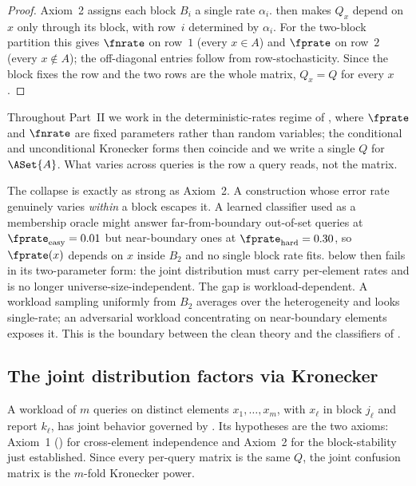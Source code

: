\begin{proof}
Axiom~2 assigns each block $B_i$ a single rate $\alpha_i$.
 then makes $Q_x$ depend on $x$ only through its
block, with row~$i$ determined by $\alpha_i$. For the two-block partition
this gives $\fnrate$ on row~$1$ (every $x \in A$) and $\fprate$ on row~$2$
(every $x \notin A$); the off-diagonal entries follow from row-stochasticity.
Since the block fixes the row and the two rows are the whole matrix,
$Q_x = Q$ for every $x$.
\end{proof}

Throughout Part~II we work in the deterministic-rates regime of
, where $\fprate$ and $\fnrate$ are fixed
parameters rather than random variables; the conditional and unconditional
Kronecker forms then coincide and we write a single $Q$ for $\ASet{A}$.
What varies across queries is the row a query reads, not the matrix.

\begin{remark}
\label{rem:heterogeneous-block}
The collapse is exactly as strong as Axiom~2. A construction whose error
rate genuinely varies \emph{within} a block escapes it. A learned
classifier used as a membership oracle might answer far-from-boundary
out-of-set queries at $\fprate_{\text{easy}} = 0.01$ but near-boundary ones
at $\fprate_{\text{hard}} = 0.30$, so $\fprate(x)$ depends on $x$ inside
$B_2$ and no single block rate fits.
 below then fails in its two-parameter form: the
joint distribution must carry per-element rates and is no longer
universe-size-independent. The gap is workload-dependent. A workload
sampling uniformly from $B_2$ averages over the heterogeneity and looks
single-rate; an adversarial workload concentrating on near-boundary
elements exposes it. This is the boundary between the clean theory and the
classifiers of .
\end{remark}

\subsection*{The joint distribution factors via Kronecker}

A workload of $m$ queries on distinct elements $x_1, \ldots, x_m$, with
$x_\ell$ in block $j_\ell$ and report $k_\ell$, has joint behavior governed
by . Its hypotheses are the two axioms: Axiom~1
() for cross-element
independence and Axiom~2 for
the block-stability just established. Since every per-query matrix is the
same $Q$, the joint confusion matrix is the $m$-fold Kronecker power.

